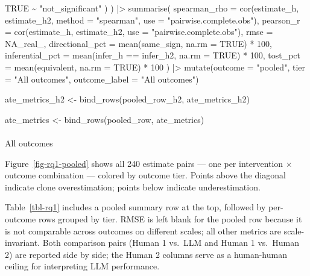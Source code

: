 \documentclass[
  letterpaper,
  DIV=11,
  numbers=noendperiod]{scrartcl}
\makeatletter
\let\oldparagraph\paragraph
\renewcommand{\paragraph}{
    \@ifstar
      \xxxParagraphStar
      \xxxParagraphNoStar
  }
\newcommand{\xxxParagraphStar}[1]{\oldparagraph*{#1}\mbox{}}
\newcommand{\xxxParagraphNoStar}[1]{\oldparagraph{#1}\mbox{}}
\newenvironment{Shaded}{\begin{snugshade}}{\end{snugshade}}
\newcommand{\AttributeTok}[1]{\textcolor[rgb]{0.40,0.45,0.13}{#1}}
\newcommand{\ConstantTok}[1]{\textcolor[rgb]{0.56,0.35,0.01}{#1}}
\newcommand{\DecValTok}[1]{\textcolor[rgb]{0.68,0.00,0.00}{#1}}
\newcommand{\FunctionTok}[1]{\textcolor[rgb]{0.28,0.35,0.67}{#1}}
\newcommand{\NormalTok}[1]{\textcolor[rgb]{0.00,0.23,0.31}{#1}}
\newcommand{\OtherTok}[1]{\textcolor[rgb]{0.00,0.23,0.31}{#1}}
\newcommand{\SpecialCharTok}[1]{\textcolor[rgb]{0.37,0.37,0.37}{#1}}
\newcommand{\StringTok}[1]{\textcolor[rgb]{0.13,0.47,0.30}{#1}}
\makeatother
\begin{document}
\begin{Shaded}
\begin{Highlighting}[]
      \ConstantTok{TRUE} \SpecialCharTok{\textasciitilde{}} \StringTok{"not\_significant"}
\NormalTok{    )}
\NormalTok{  ) }\SpecialCharTok{|\textgreater{}}
  \FunctionTok{summarise}\NormalTok{(}
    \AttributeTok{spearman\_rho    =} \FunctionTok{cor}\NormalTok{(estimate\_h, estimate\_h2, }\AttributeTok{method =} \StringTok{"spearman"}\NormalTok{,}
                          \AttributeTok{use =} \StringTok{"pairwise.complete.obs"}\NormalTok{),}
    \AttributeTok{pearson\_r       =} \FunctionTok{cor}\NormalTok{(estimate\_h, estimate\_h2, }\AttributeTok{use =} \StringTok{"pairwise.complete.obs"}\NormalTok{),}
    \AttributeTok{rmse            =} \ConstantTok{NA\_real\_}\NormalTok{,}
    \AttributeTok{directional\_pct =} \FunctionTok{mean}\NormalTok{(same\_sign,  }\AttributeTok{na.rm =} \ConstantTok{TRUE}\NormalTok{) }\SpecialCharTok{*} \DecValTok{100}\NormalTok{,}
    \AttributeTok{inferential\_pct =} \FunctionTok{mean}\NormalTok{(infer\_h }\SpecialCharTok{==}\NormalTok{ infer\_h2, }\AttributeTok{na.rm =} \ConstantTok{TRUE}\NormalTok{) }\SpecialCharTok{*} \DecValTok{100}\NormalTok{,}
    \AttributeTok{tost\_pct        =} \FunctionTok{mean}\NormalTok{(equivalent, }\AttributeTok{na.rm =} \ConstantTok{TRUE}\NormalTok{) }\SpecialCharTok{*} \DecValTok{100}
\NormalTok{  ) }\SpecialCharTok{|\textgreater{}}
  \FunctionTok{mutate}\NormalTok{(}\AttributeTok{outcome =} \StringTok{"pooled"}\NormalTok{, }\AttributeTok{tier =} \StringTok{"All outcomes"}\NormalTok{, }\AttributeTok{outcome\_label =} \StringTok{"All outcomes"}\NormalTok{)}

\NormalTok{ate\_metrics\_h2 }\OtherTok{\textless{}{-}} \FunctionTok{bind\_rows}\NormalTok{(pooled\_row\_h2, ate\_metrics\_h2)}

\NormalTok{ate\_metrics }\OtherTok{\textless{}{-}} \FunctionTok{bind\_rows}\NormalTok{(pooled\_row, ate\_metrics)}
\end{Highlighting}
\end{Shaded}

\paragraph{All outcomes}\label{all-outcomes}

Figure~\ref{fig-rq1-pooled} shows all 240 estimate pairs --- one per
intervention × outcome combination --- colored by outcome tier. Points
above the diagonal indicate clone overestimation; points below indicate
underestimation.

Table~\ref{tbl-rq1} includes a pooled summary row at the top, followed
by per-outcome rows grouped by tier. RMSE is left blank for the pooled
row because it is not comparable across outcomes on different scales;
all other metrics are scale-invariant. Both comparison pairs (Human 1
vs.~LLM and Human 1 vs.~Human 2) are reported side by side; the Human 2
columns serve as a human-human ceiling for interpreting LLM performance.
\end{document}
